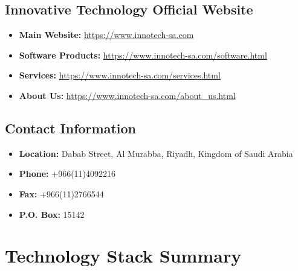 \subsection{Innovative Technology Official Website}

\begin{itemize}
    \item \textbf{Main Website:} \url{https://www.innotech-sa.com}
    \item \textbf{Software Products:} \url{https://www.innotech-sa.com/software.html}
    \item \textbf{Services:} \url{https://www.innotech-sa.com/services.html}
    \item \textbf{About Us:} \url{https://www.innotech-sa.com/about_us.html}
\end{itemize}

\subsection{Contact Information}

\begin{itemize}
    \item \textbf{Location:} Dabab Street, Al Murabba, Riyadh, Kingdom of Saudi Arabia
    \item \textbf{Phone:} +966(11)4092216
    \item \textbf{Fax:} +966(11)2766544
    \item \textbf{P.O. Box:} 15142
\end{itemize}

\section{Technology Stack Summary}

